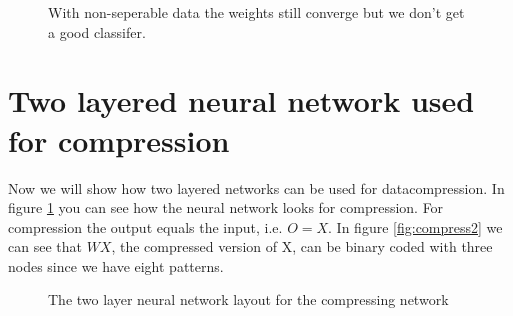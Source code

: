 \documentclass[a4paper,11pt]{article}
\begin{document}
\begin{figure}[h!]
\caption{With non-seperable data the weights still converge but we don't get a good classifer.}
\end{figure}

\clearpage
\section{Two layered neural network used for compression}
Now we will show how two layered networks can be used for datacompression. In figure \ref{fig:compress} you can see how the neural network looks for compression. For compression the output equals the input, i.e. $O=X$. In figure \ref{fig:compress2} we can see that $WX$, the compressed version of X, can be binary coded with three nodes since we have eight patterns.

\vspace{5cm}
\begin{figure}[h!]
\label{fig:compress}
\caption{The two layer neural network layout for the compressing network}
\end{figure}
\end{document}
